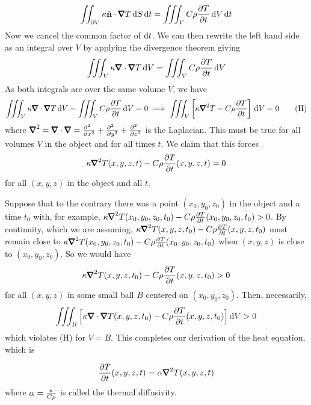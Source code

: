 \begin{equation*}
\dblInt_{\partial V} \ka\hn\cdot\vnabla T\,\dee{S}\,\dee{t}
=\tripInt_V C\rho\frac{\partial T}{\partial t}\,\dee{V}\,\dee{t}
\end{equation*}
Now we cancel the common factor of $\mathrm{d}t$. We can then rewrite the
left hand side as an integral over $V$ by applying the divergence theorem
giving
\begin{equation*}
\tripInt_{V} \ka\vnabla\cdot\vnabla T\,\dee{V}
=\tripInt_V C\rho\frac{\partial T}{\partial t}\,\dee{V}
\end{equation*}
As both integrals are over the same volume $V$, we have
\begin{equation}
\tripInt_{V} \ka\vnabla\cdot\vnabla T\,\dee{V}
-\tripInt_V C\rho\frac{\partial T}{\partial t}\,\dee{V}
=0
\implies 
\tripInt_{V} \left[\ka\vnabla^2 T
          -C\rho\frac{\partial T}{\partial t}\right]\,\dee{V}=0
\tag{H}\end{equation}
where $\vnabla^2=\vnabla\cdot\vnabla=\frac{\partial^2\hfill}{\partial x^2}+
\frac{\partial^2\hfill}{\partial y^2}+\frac{\partial^2\hfill}{\partial z^2}$
is the Laplacian.
This must be true for all volumes $V$ in the object and for all times $t$. We
claim that this forces 
\begin{equation*}
\ka\vnabla^2 T(x,y,z,t)-C\rho\frac{\partial T}{\partial t}(x,y,z,t)=0
\end{equation*}
for all $(x,y,z)$ in the object and all $t$.

Suppose that to the contrary there was a point $(x_0,y_0,z_0)$ in the object
and a time $t_0$ with, for example,
$\ka\vnabla^2 T(x_0,y_0,z_0,t_0)
   -C\rho\frac{\partial T}{\partial t}(x_0,y_0,z_0,t_0)>0$. 
By continuity, which we are assuming, $\ka\vnabla^2 T(x,y,z,t_0)
   -C\rho\frac{\partial T}{\partial t}(x,y,z,t_0)$
must remain close to $\ka\vnabla^2 T(x_0,y_0,z_0,t_0)
   -C\rho\frac{\partial T}{\partial t}(x_0,y_0,z_0,t_0)$ when $(x,y,z)$ 
is close to $(x_0,y_0,z_0)$.
So we would have 
\begin{equation*}
\ka\vnabla^2 T(x,y,z,t_0)
-C\rho\frac{\partial T}{\partial t}(x,y,z,t_0)>0
\end{equation*}
for all $(x,y,z)$ in some small ball $B$ centered on $(x_0,y_0,z_0)$. 
Then, necessarily,
\begin{equation*}
\tripInt_{B} \Big[\ka\vnabla\cdot\vnabla T(x,y,z,t_0)
      -C\rho\frac{\partial T}{\partial t}(x,y,z,t_0)\Big]\,\dee{V}>0
\end{equation*}
which violates (H) for $V=B$.  This completes our derivation of the 
heat equation, which is
\begin{impeqn}\label{eqn:heat}
\begin{equation*}
\frac{\partial T}{\partial t}(x,y,z,t)
=\alpha \vnabla^2 T(x,y,z,t)
\end{equation*}
where $\alpha=\frac{\kappa}{C\rho}$ is called the thermal diffusivity.
\end{impeqn}


